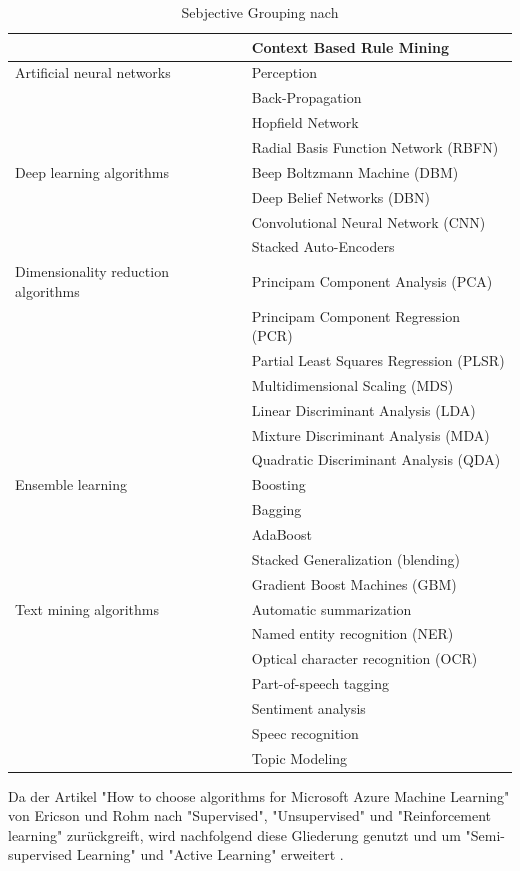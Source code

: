 \begin{table}[H]
\begin{tabular}{|l|l|}
& Context Based Rule Mining\\
\hline
Artificial neural networks & Perception\\
& Back-Propagation\\
& Hopfield Network\\
& Radial Basis Function Network (RBFN)\\
\hline
Deep learning algorithms & Beep Boltzmann Machine (DBM)\\
& Deep Belief Networks (DBN)\\
& Convolutional Neural Network (CNN)\\
& Stacked Auto-Encoders\\
\hline
Dimensionality reduction algorithms & Principam Component Analysis (PCA)\\
& Principam Component Regression (PCR)\\
& Partial Least Squares Regression (PLSR)\\
& Multidimensional Scaling (MDS)\\
& Linear Discriminant Analysis (LDA)\\
& Mixture Discriminant Analysis (MDA)\\
& Quadratic Discriminant Analysis (QDA)\\
\hline
Ensemble learning & Boosting\\
& Bagging\\
& AdaBoost\\
& Stacked Generalization (blending)\\
& Gradient Boost Machines (GBM)\\
\hline
Text mining algorithms & Automatic summarization\\
& Named entity recognition (NER)\\
& Optical character recognition (OCR)\\
& Part-of-speech tagging\\
& Sentiment analysis\\
& Speec recognition\\
& Topic Modeling\\
   \hline
\end{tabular}
\caption{Sebjective Grouping nach \citep[S.~224-229]{ramasubramanian_machine_2017}}
\label{tab:SebjectiveGrouping}
\end{table}

Da der Artikel "How to choose algorithms for Microsoft Azure Machine Learning" von Ericson und Rohm nach "Supervised", "Unsupervised" und "Reinforcement learning" zurückgreift, wird nachfolgend diese Gliederung genutzt und um "Semi-supervised Learning" und "Active Learning" erweitert \citep{ericson_microsoft_2017}. \par

